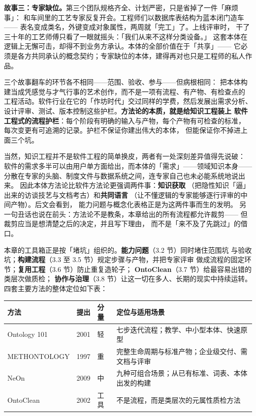 \textbf{故事三：专家缺位。}第三个团队规格齐全、计划严密，只是省掉了一件「麻烦事」：
和车间里的工艺专家反复开会。工程师们以数据库表结构为蓝本闭门造车——
表名变成类名，外键变成对象属性，两周就「完工」了。上线评审时，
干了三十年的工艺师傅只看了一眼就摇头：「我们从来不这样分类设备。」
这套本体在逻辑上无懈可击，却得不到业务方承认。本体的全部价值在于「共享」——
它必须是各方共同承认的概念契约；专家缺位的本体，建得再对也只是工程师的私人作品。

三个故事翻车的环节各不相同——范围、验收、参与——但病根相同：
把本体构建当成凭感觉与才气行事的艺术创作，而不是一项有流程、有产物、有检查点的
工程活动。软件行业在它的「作坊时代」交过同样的学费，然后发展出需求分析、
设计评审、测试、版本控制这些护栏。\textbf{方法论的本质，就是给知识工程装上
软件工程式的流程护栏}：每个阶段有明确的输入与产物，每个产物有可检查的标准，
每次变更有可追溯的记录。护栏不保证你建出伟大的本体，
但能保证你不掉进上面三个坑。

当然，知识工程并不是软件工程的简单换皮，两者有一处深刻差异值得先说破：
软件的需求多半可以由用户单方面给出，而本体的「需求」——领域知识本身——
分散在专家的头脑、制度文件与数据系统之间，连专家自己也未必能系统地说出来。
因此本体方法论比软件方法论更强调两件事：\textbf{知识获取}
（把隐性知识「逼」出来的访谈技艺与文档考古）和\textbf{共同语言}
（让不懂逻辑的专家能够逐行评审的中间产物）。后文会看到，
能力问题与概念化表格正是为这两件事而生的发明。
另一句丑话也说在前头：方法论不是教条，本章给出的所有流程都允许裁剪——
但裁剪应当是想清楚之后的决定，并且写下理由，
而不是「来不及了先跳过」的借口。

本章的工具箱正是按「堵坑」组织的。\textbf{能力问题}（3.2 节）同时堵住范围坑
与验收坑；\textbf{构建流程}（3.3 至 3.5 节）规定步骤与产物，并把专家评审
做成流程的固定环节；\textbf{复用工程}（3.6 节）防止重复造轮子；
\textbf{OntoClean}（3.7 节）给最容易出错的类层次做质检；
\textbf{协作与治理}（3.8 节）让这一切在多人、长期的现实中持续运转。
四套主要方法的整体定位如下表：

\begin{center}
\begin{tabularx}{\linewidth}{@{}lllX@{}}
\toprule
\textbf{方法} & \textbf{提出} & \textbf{分量} & \textbf{定位与适用场景} \\
\midrule
Ontology 101 & 2001 & 轻 & 七步迭代流程；教学、中小型本体、快速原型 \\
METHONTOLOGY & 1997 & 重 & 完整生命周期与标准产物；企业级交付、需文档与评审 \\
NeOn & 2009 & 中 & 九种可组合场景；从已有标准、词表、本体出发的构建 \\
OntoClean & 2002 & 工具 & 不是流程，而是类层次的元属性质检方法 \\
\bottomrule
\end{tabularx}
\end{center}

